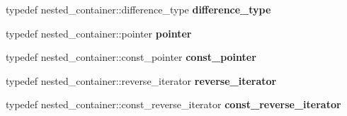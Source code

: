 \begin{DoxyCompactItemize}
\mbox{\label{classnasty__vector_ae1bf082776fdf86b1749d83dd5a4e87b}} 
typedef nested\+\_\+container\+::difference\+\_\+type {\bfseries difference\+\_\+type}
\item 
\mbox{\label{classnasty__vector_af52715e499768eebf338308f1a95c245}} 
typedef nested\+\_\+container\+::pointer {\bfseries pointer}
\item 
\mbox{\label{classnasty__vector_a370ae080db98313539ec5477284704f0}} 
typedef nested\+\_\+container\+::const\+\_\+pointer {\bfseries const\+\_\+pointer}
\item 
\mbox{\label{classnasty__vector_a09dbb0104dbddd5b1013c73af2bb316e}} 
typedef nested\+\_\+container\+::reverse\+\_\+iterator {\bfseries reverse\+\_\+iterator}
\item 
\mbox{\label{classnasty__vector_a16eb06e6bac425164121f94d3b3a8acc}} 
typedef nested\+\_\+container\+::const\+\_\+reverse\+\_\+iterator {\bfseries const\+\_\+reverse\+\_\+iterator}
\end{DoxyCompactItemize}
